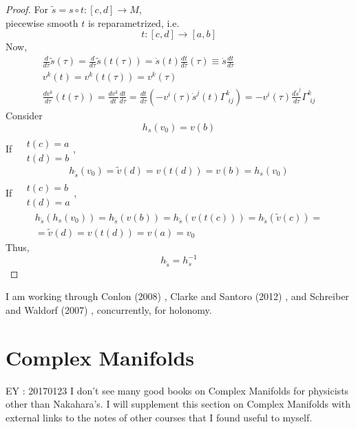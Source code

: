 \documentclass[10pt]{amsart}
\begin{document}
\begin{multicols*}{2}
\begin{proof}
For $\widetilde{s} = s\circ t:[c,d] \to M$, \\
piecewise smooth $t$ is reparametrized, i.e. 
\begin{equation}
	t:[c,d] \to [a,b]
\end{equation}  
Now, 
\[
\begin{gathered}
	\frac{d}{d\tau}\widetilde{s}(\tau) = \frac{d}{d\tau} \widetilde{s}(t(\tau)) = \dot{s}(t) \frac{dt}{d\tau}(\tau) \equiv \dot{s} \frac{dt}{d\tau} \\ 
v^k(t) = v^k(t(\tau)) = v^k(\tau) \\ 
 \frac{dv^k}{d\tau}(t(\tau) ) = \frac{dv^k}{dt} \frac{dt}{ d\tau } = \frac{dt}{d\tau}(-v^i( \tau) \dot{s}^j(t) \Gamma^k_{ \,\, ij} ) = -v^i(\tau) \frac{d\widetilde{s}^j }{ d\tau} \Gamma^k_{ \, \, ij} 
\end{gathered}
\]
Consider 
\[
h_s(v_0) = v(b)
\]
If $\begin{aligned} & \quad \\ 
	& t(c) = a \\ 
	& t(d)=b \end{aligned}$, 
\[
h_{\widetilde{s}}(v_0) = \widetilde{v}(d) = v(t(d)) = v(b) = h_s(v_0)
\]
If $\begin{aligned} & \quad \\ 
	& t(c) = b \\ 
	& t(d)=a \end{aligned}$, 
\[
\begin{gathered}
h_{\widetilde{s}}(h_s(v_0) )  = h_{\widetilde{s}}( v(b)) = h_{\widetilde{s}}(v(t(c))) = h_{\widetilde{s}}(\widetilde{v}(c)) = \\
	= \widetilde{v}(d) = v(t(d)) = v(a) = v_0
\end{gathered}
\]
Thus, 
\[
\boxed{ h_{\widetilde{s}}= h_s^{-1} }
\]


\end{proof}

I am working through Conlon (2008) \cite{Conl2008} , Clarke and Santoro (2012) \cite{ClSa2012}, and Schreiber and Waldorf (2007) , concurrently, for holonomy.  









\part{Complex Manifolds}

EY : 20170123 I don't see many good books on Complex Manifolds for physicists other than Nakahara's.  I will supplement this section on Complex Manifolds with external links to the notes of other courses that I found useful to myself.



\end{multicols*}
\end{document}
